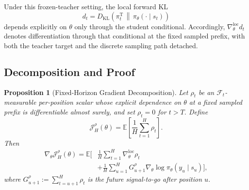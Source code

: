 \documentclass[letterpaper]{article} %
\newtheorem{proposition}{Proposition}    %
\begin{document}
Under this frozen-teacher setting, the local forward KL
\begin{equation}
    d_t
    =
    D_{\mathrm{KL}}\!\left(
        \pi_t^{\mathrm T}
        \,\middle\|\,
        \pi_\theta(\cdot\mid s_t)
    \right)
\end{equation}
depends explicitly on $\theta$ only through the student conditional.
Accordingly, $\nabla_\theta^{\mathrm{loc}}d_t$ denotes differentiation
through that conditional at the fixed sampled prefix, with both the
teacher target and the discrete sampling path detached.

\subsection{Decomposition and Proof}
\label{app:decomposition}

\begin{proposition}[Fixed-Horizon Gradient Decomposition]
\label{prop:supp_fixed_horizon}
Let $\rho_t$ be an $\mathcal F_t$-measurable per-position scalar whose
explicit dependence on $\theta$ at a fixed sampled prefix is
differentiable almost surely, and set $\rho_t=0$ for $t>T$. Define
\begin{equation}
    \mathcal J_H^\rho(\theta)
    =
    \mathbb E\!\left[
        \frac{1}{H}\sum_{t=1}^{H}\rho_t
    \right].
\end{equation}
Then
\begin{equation}
\begin{split}
    \nabla_\theta\mathcal J_H^\rho(\theta)
    =
    \mathbb E\Bigg[
        &\frac{1}{H}\sum_{t=1}^{H}
        \nabla_\theta^{\mathrm{loc}}\rho_t\\
        &+
        \frac{1}{H}\sum_{u=1}^{H}
        G^\rho_{u+1}
        \nabla_\theta\log\pi_\theta(y_u\mid s_u)
    \Bigg],
    \label{eq:supp_fixed_horizon_decomposition}
\end{split}
\end{equation}
where
$G^\rho_{u+1}:=\sum_{t=u+1}^{H}\rho_t$ is the future
signal-to-go after position $u$.
\end{proposition}
\end{document}
